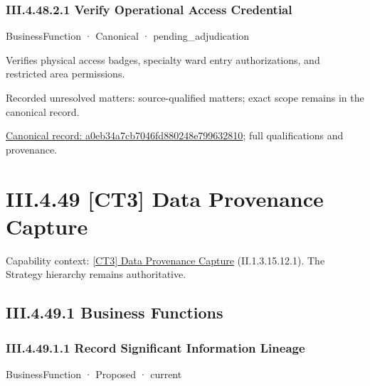 \subsubsection*{III.4.48.2.1 Verify Operational Access Credential}
\label{navigation:III.4.48.2.1}

\label{element:a0eb34a7cb7046fd880248e799632810}
{\small BusinessFunction · Canonical · pending\_adjudication}\par

Verifies physical access badges, specialty ward entry authorizations, and restricted area permissions.


{\small Recorded unresolved matters: source-qualified matters; exact scope remains in the canonical record.}\par
{\footnotesize \href{../../../../continuum/business/business-function/a0eb34a7cb7046fd880248e799632810.md}{Canonical record: a0eb34a7cb7046fd880248e799632810}; full qualifications and provenance.}\par
\section*{III.4.49 [CT3] Data Provenance Capture}
\label{navigation:III.4.49}

{\small Capability context: \hyperref[element:44a7937520a54945b06b5fd4a2bbd870]{[CT3] Data Provenance Capture} (II.1.3.15.12.1). The Strategy hierarchy remains authoritative.}\par
\subsection*{III.4.49.1 Business Functions}
\label{navigation:III.4.49.1}

\subsubsection*{III.4.49.1.1 Record Significant Information Lineage}
\label{navigation:III.4.49.1.1}

\label{element:afdb0358393f4560b926330a14c1aedd}
{\small BusinessFunction · Proposed · current}\par

